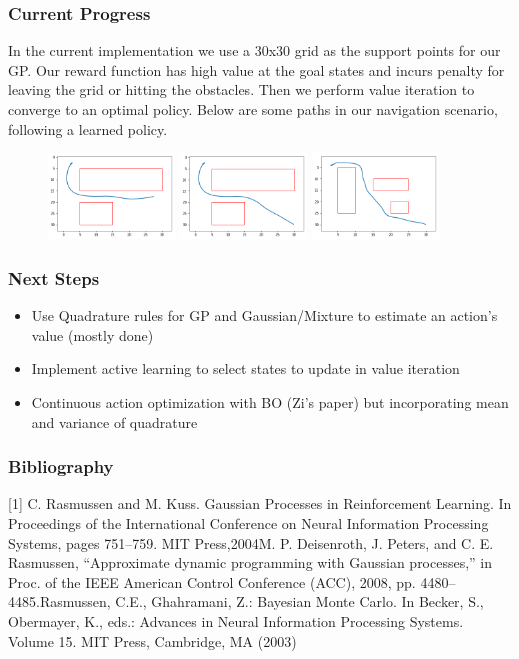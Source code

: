 \documentclass[8pt]{beamer}
\begin{document}
\begin{frame}
\frametitle{Current Progress}
In the current implementation we use a 30x30 grid as the support points for our GP. Our reward function has high value at the goal states and incurs penalty for leaving the grid or hitting the obstacles. Then we perform value iteration to converge to an optimal policy. Below are some paths in our navigation scenario, following a learned policy.
\begin{figure}
   \includegraphics[width=0.3\textwidth]{index}
   \hfill
   \includegraphics[width=0.3\textwidth]{index2}
   \hfill
   \includegraphics[width=0.3\textwidth]{index3}
\end{figure}
\end{frame}

\begin{frame}
\frametitle{Next Steps}
\begin{itemize}
\item Use Quadrature rules for GP and Gaussian/Mixture to estimate an action's value (mostly done)
\item Implement active learning to select states to update in value iteration
\item Continuous action optimization with BO (Zi's paper) but incorporating mean and variance of quadrature
\end{itemize}
\end{frame}

\begin{frame}
\frametitle{Bibliography}
[1] C. Rasmussen and M. Kuss. Gaussian Processes in Reinforcement Learning. In Proceedings of the International Conference on Neural Information Processing Systems, pages 751–759. MIT Press,2004\newline
[2]   M.  P.  Deisenroth,  J.  Peters,  and  C.  E.  Rasmussen,  “Approximate dynamic programming with Gaussian processes,” in Proc. of the IEEE American Control Conference (ACC), 2008, pp. 4480–4485.\newline
[3] Rasmussen, C.E., Ghahramani, Z.: Bayesian Monte Carlo. In Becker, S., Obermayer, K., eds.: Advances in Neural Information Processing Systems. Volume 15. MIT Press, Cambridge, MA (2003)
\end{frame}

 
\end{document}
